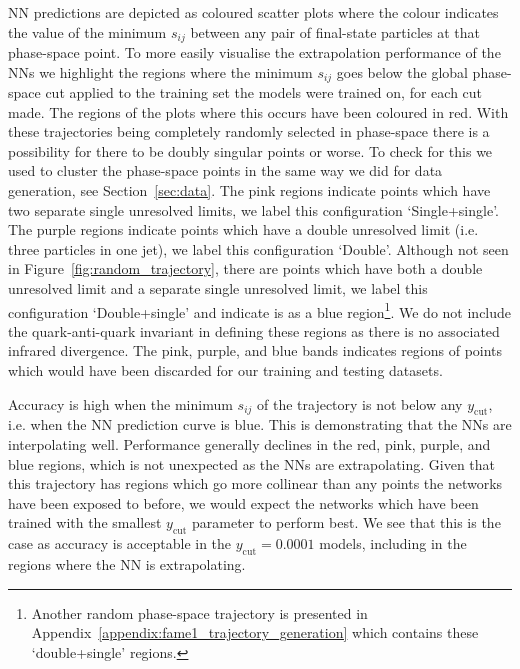 \documentclass[main.tex]{subfiles}
\begin{document}
NN predictions are depicted as coloured scatter plots where the colour indicates the value of the minimum $s_{ij}$ between any pair of final-state particles at that phase-space point.
To more easily visualise the extrapolation performance of the NNs we highlight the regions where the minimum $s_{ij}$ goes below the global phase-space cut applied to the training set the models were trained on, 
for each cut made. The regions of the plots where this occurs have been coloured in red.  
With these trajectories being completely randomly selected in phase-space there is a possibility for there to be doubly singular points or worse.
To check for this we used {\FastJet} to cluster the phase-space points in the same way we did for data generation, see Section~\ref{sec:data}.
The pink regions indicate points which have two separate single unresolved limits, we label this configuration `Single+single'.
The purple regions indicate points which have a double unresolved limit (i.e. three particles in one jet), we label this configuration `Double'.
Although not seen in Figure~\ref{fig:random_trajectory}, there are points which have both a double unresolved limit and a separate single unresolved limit,
we label this configuration `Double+single' and indicate is as a blue region\footnote{Another random phase-space trajectory is presented in Appendix~\ref{appendix:fame1_trajectory_generation} which contains these `double+single' regions.}.
We do not include the quark-anti-quark invariant in defining these regions as there is no associated infrared divergence.
The pink, purple, and blue bands indicates regions of points which would have been discarded for our training and testing datasets.

Accuracy is high when the minimum $s_{ij}$ of the trajectory is not below any $y_{\mathrm{cut}}$, i.e. when the NN prediction curve is blue.
This is demonstrating that the NNs are interpolating well.
Performance generally declines in the red, pink, purple, and blue regions, which is not unexpected as the NNs are extrapolating.
Given that this trajectory has regions which go more collinear than any points the networks have been exposed to before, we would expect the networks which
have been trained with the smallest $y_{\mathrm{cut}}$ parameter to perform best.
We see that this is the case as accuracy is acceptable in the $y_{\mathrm{cut}} = 0.0001$ models, including in the regions where the NN is extrapolating.
\end{document}
